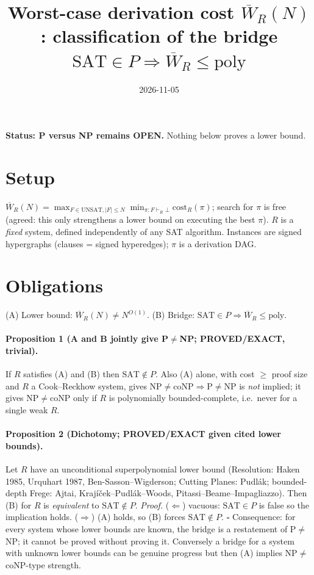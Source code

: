 \documentclass{article}\usepackage{amsmath,amssymb,amsthm}
\title{Worst-case derivation cost $\overline W_R(N)$: classification of the bridge $\mathrm{SAT}\in P\Rightarrow \overline W_R\le\mathrm{poly}$}
\date{2026-11-05}
\begin{document}
\maketitle
\noindent\textbf{Status: P versus NP remains OPEN.} Nothing below proves a lower bound.

\section*{Setup}
$\overline W_R(N)=\max_{F\in\mathrm{UNSAT},|F|\le N}\min_{\pi:F\vdash_R\bot}\mathrm{cost}_R(\pi)$; search for $\pi$ is free (agreed: this only strengthens a lower bound on executing the best $\pi$). $R$ is a \emph{fixed} system, defined independently of any SAT algorithm. Instances are signed hypergraphs (clauses = signed hyperedges); $\pi$ is a derivation DAG.

\section*{Obligations}
(A) Lower bound: $\overline W_R(N)\ne N^{O(1)}$. \quad (B) Bridge: $\mathrm{SAT}\in P\Rightarrow\overline W_R\le\mathrm{poly}$.

\paragraph{Proposition 1 (A and B jointly give P$\ne$NP; PROVED/EXACT, trivial).} If $R$ satisfies (A) and (B) then $\mathrm{SAT}\notin P$. Also (A) alone, with cost $\ge$ proof size and $R$ a Cook--Reckhow system, gives NP$\ne$coNP$\Rightarrow$P$\ne$NP is \emph{not} implied; it gives NP$\ne$coNP only if $R$ is polynomially bounded-complete, i.e.\ never for a single weak $R$.

\paragraph{Proposition 2 (Dichotomy; PROVED/EXACT given cited lower bounds).} Let $R$ have an unconditional superpolynomial lower bound (Resolution: Haken 1985, Urquhart 1987, Ben-Sasson--Wigderson; Cutting Planes: Pudl\'ak; bounded-depth Frege: Ajtai, Kraj\'i\v cek--Pudl\'ak--Woods, Pitassi--Beame--Impagliazzo). Then (B) for $R$ is \emph{equivalent} to $\mathrm{SAT}\notin P$. 
\emph{Proof.} ($\Leftarrow$) vacuous: $\mathrm{SAT}\in P$ is false so the implication holds. ($\Rightarrow$) (A) holds, so (B) forces $\mathrm{SAT}\notin P$. $\square$
Consequence: for every system whose lower bounds are known, the bridge is a restatement of P$\ne$NP; it cannot be proved without proving it. Conversely a bridge for a system with unknown lower bounds can be genuine progress but then (A) implies NP$\ne$coNP-type strength.
\end{document}
